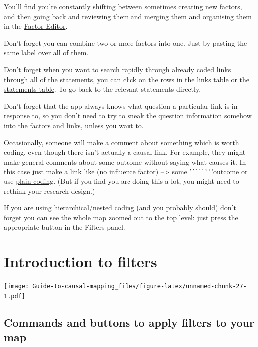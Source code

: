 \documentclass[
]{book}
\begin{document}
You'll find you're constantly shifting between sometimes creating new factors, and then going back and reviewing them and merging them and organising them in the \protect\hyperlink{factor-editor}{Factor Editor}.

Don't forget you can combine two or more factors into one. Just by pasting the same label over all of them.

Don't forget when you want to search rapidly through already coded links through all of the statements, you can click on the rows in the \protect\hyperlink{the-links-table}{links table} or the \protect\hyperlink{the-statements-table}{statements table}. To go back to the relevant statements directly.

Don't forget that the app always knows what question a particular link is in response to, so you don't need to try to sneak the question information somehow into the factors and links, unless you want to.

Occasionally, someone will make a comment about something which is worth coding, even though there isn't actually a causal link. For example, they might make general comments about some outcome without saying what causes it. In this case just make a link like (no influence factor) --\textgreater{} some '\,'\,'\,'\,'\,'\,'\,'outcome or use \protect\hyperlink{xplain_coding}{plain coding}. (But if you find you are doing this a lot, you might need to rethink your research design.)

If you are using \protect\hyperlink{xhierarchical-coding}{hierarchical/nested coding} (and you probably should) don't forget you can see the whole map zoomed out to the top level: just press the appropriate button in the Filters panel.

\hypertarget{xintro-filters}{%
\chapter{Introduction to filters}\label{xintro-filters}}

\href{https://player.vimeo.com/video/618270513}{\texttt{[image: Guide-to-causal-mapping\_files/figure-latex/unnamed-chunk-27-1.pdf]}}

\hypertarget{commands-and-buttons-to-apply-filters-to-your-map}{%
\section{Commands and buttons to apply filters to your map}\label{commands-and-buttons-to-apply-filters-to-your-map}}
\end{document}
